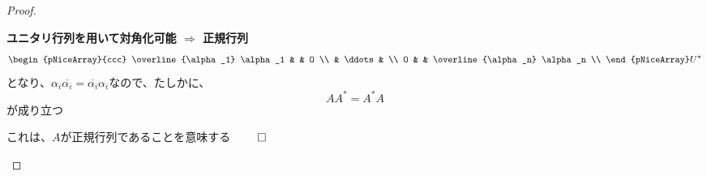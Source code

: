 \documentclass[../../../topic_linear-algebra]{subfiles}
\begin{document}
\begin{proof}
\begin{subpattern}{\bfseries ユニタリ行列を用いて対角化可能 $\Longrightarrow$ 正規行列}
\begin{align*}
\begin{pNiceArray}{ccc}
                   \overline{\alpha_1} \alpha_1 & & O \\
                   &  \ddots & \\
                   O & & \overline{\alpha_n} \alpha_n \\
                 \end{pNiceArray} U^*
    \end{align*}
    となり、$\alpha_i \overline{\alpha_i} = \overline{\alpha_i} \alpha_i$なので、たしかに、
    \begin{equation*}
      AA^* = A^*A
    \end{equation*}
    が成り立つ

    これは、$A$が正規行列であることを意味する $\qed$
  \end{subpattern}
\end{proof}
\end{document}
